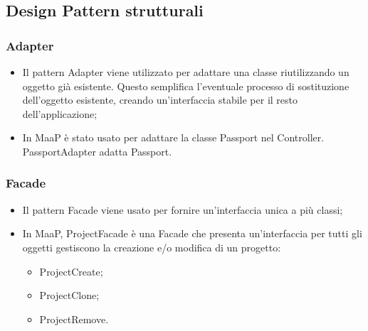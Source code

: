 \subsection{Design Pattern strutturali}
\subsubsection{Adapter}
\begin{itemize}
\item {} Il pattern Adapter viene utilizzato per adattare una classe riutilizzando un oggetto già esistente. Questo semplifica l'eventuale processo di sostituzione dell'oggetto esistente, creando un'interfaccia stabile per il resto dell'applicazione;
\item {} In MaaP è stato usato per adattare la classe Passport nel Controller. PassportAdapter adatta Passport.
\end{itemize}

\subsubsection{Facade}
\begin{itemize}
\item {} Il pattern Facade viene usato per fornire un'interfaccia unica a più classi;
\item {} In MaaP, ProjectFacade è una Facade che presenta un'interfaccia per tutti gli oggetti gestiscono la creazione e/o modifica di un progetto:\\
\begin{itemize}
\item ProjectCreate;
\item ProjectClone;
\item ProjectRemove.
\end{itemize}
\end{itemize}

\newpage
